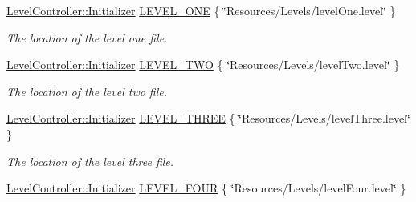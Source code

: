\begin{DoxyCompactItemize}
\item 
\hypertarget{class_level_controller_aed3a20ba260b3562516561bc065fd3de}{\hyperlink{class_level_controller_1_1_initializer}{Level\+Controller\+::\+Initializer} \hyperlink{class_level_controller_aed3a20ba260b3562516561bc065fd3de}{L\+E\+V\+E\+L\+\_\+\+O\+N\+E} \{ \char`\"{}Resources/Levels/level\+One.\+level\char`\"{} \}}\label{class_level_controller_aed3a20ba260b3562516561bc065fd3de}

\begin{DoxyCompactList}\small\item\em The location of the level one file. \end{DoxyCompactList}\item 
\hypertarget{class_level_controller_a83feeec328501b067d422301c5b5cea6}{\hyperlink{class_level_controller_1_1_initializer}{Level\+Controller\+::\+Initializer} \hyperlink{class_level_controller_a83feeec328501b067d422301c5b5cea6}{L\+E\+V\+E\+L\+\_\+\+T\+W\+O} \{ \char`\"{}Resources/Levels/level\+Two.\+level\char`\"{} \}}\label{class_level_controller_a83feeec328501b067d422301c5b5cea6}

\begin{DoxyCompactList}\small\item\em The location of the level two file. \end{DoxyCompactList}\item 
\hypertarget{class_level_controller_a0d73c813ab9ed413b8821c19d03e4b2e}{\hyperlink{class_level_controller_1_1_initializer}{Level\+Controller\+::\+Initializer} \hyperlink{class_level_controller_a0d73c813ab9ed413b8821c19d03e4b2e}{L\+E\+V\+E\+L\+\_\+\+T\+H\+R\+E\+E} \{ \char`\"{}Resources/Levels/level\+Three.\+level\char`\"{} \}}\label{class_level_controller_a0d73c813ab9ed413b8821c19d03e4b2e}

\begin{DoxyCompactList}\small\item\em The location of the level three file. \end{DoxyCompactList}\item 
\hypertarget{class_level_controller_af795ecf4216b61bcb8068ec80d2a2246}{\hyperlink{class_level_controller_1_1_initializer}{Level\+Controller\+::\+Initializer} \hyperlink{class_level_controller_af795ecf4216b61bcb8068ec80d2a2246}{L\+E\+V\+E\+L\+\_\+\+F\+O\+U\+R} \{ \char`\"{}Resources/Levels/level\+Four.\+level\char`\"{} \}}\label{class_level_controller_af795ecf4216b61bcb8068ec80d2a2246}


\end{DoxyCompactItemize}
